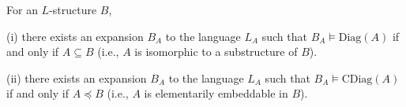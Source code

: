 For an $L$-structure $B$,

(i) there exists an expansion $B_A$ to the language $L_A$ such that $B_A \models \text{Diag}(A)$ if and only if $A \subseteq B$ (i.e., $A$ is isomorphic to a substructure of $B$).

(ii) there exists an expansion $B_A$ to the language $L_A$ such that $B_A \models \text{CDiag}(A)$ if and only if $A \preceq B$ (i.e., $A$ is elementarily embeddable in $B$).
